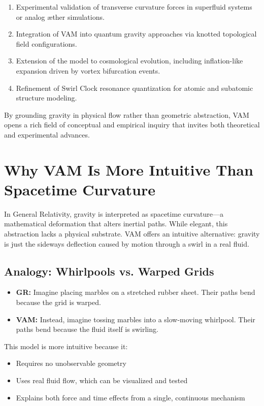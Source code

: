 \documentclass[11pt]{article}
\begin{document}
    \begin{enumerate}
        \item Experimental validation of transverse curvature forces in superfluid systems or analog æther simulations.
        \item Integration of VAM into quantum gravity approaches via knotted topological field configurations.
        \item Extension of the model to cosmological evolution, including inflation-like expansion driven by vortex bifurcation events.
        \item Refinement of Swirl Clock resonance quantization for atomic and subatomic structure modeling.
    \end{enumerate}
    By grounding gravity in physical flow rather than geometric abstraction, VAM opens a rich field of conceptual and empirical inquiry that invites both theoretical and experimental advances.

    \section*{Why VAM Is More Intuitive Than Spacetime Curvature}

    In General Relativity, gravity is interpreted as spacetime curvature---a mathematical deformation that alters inertial paths. While elegant, this abstraction lacks a physical substrate. VAM offers an intuitive alternative: gravity is just the sideways deflection caused by motion through a swirl in a real fluid.

    \subsection*{Analogy: Whirlpools vs. Warped Grids}
    \begin{itemize}
        \item \textbf{GR:} Imagine placing marbles on a stretched rubber sheet. Their paths bend because the grid is warped.
        \item \textbf{VAM:} Instead, imagine tossing marbles into a slow-moving whirlpool. Their paths bend because the fluid itself is swirling.
    \end{itemize}

    This model is more intuitive because it:
    \begin{itemize}
        \item Requires no unobservable geometry
        \item Uses real fluid flow, which can be visualized and tested
        \item Explains both force and time effects from a single, continuous mechanism
    \end{itemize}
\end{document}
